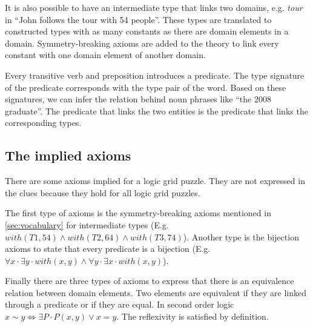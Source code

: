 
It is also possible to have an intermediate type that links two domains, e.g. \textit{tour} in ``John follows the tour with 54 people''. These types are translated to constructed types with as many constants as there are domain elements in a domain. Symmetry-breaking axioms are added to the theory to link every constant with one domain element of another domain.

Every transitive verb and preposition introduces a predicate. The type signature of the predicate corresponds with the type pair of the word. Based on these signatures, we can infer the relation behind noun phrases like ``the 2008 graduate''. The predicate that links the two entities is the predicate that links the corresponding types. %

\subsection{The implied axioms}
There are some axioms implied for a logic grid puzzle. They are not expressed in the clues because they hold for all logic grid puzzles.

The first type of axioms is the symmetry-breaking axioms mentioned in \ref{sec:vocabulary} for intermediate types (E.g. $with(T1, 54) \land with(T2, 64) \land with(T3, 74)$). Another type is the bijection axioms to state that every predicate is a bijection (E.g. $\forall x \cdot \exists y \cdot with(x, y) \land \forall y \cdot \exists x \cdot with(x, y)$).

Finally there are three types of axioms to express that there is an equivalence relation between domain elements. Two elements are equivalent if they are linked through a predicate or if they are equal. In second order logic $x \sim y \Leftrightarrow \exists P \cdot P(x, y) \lor x = y$. The reflexivity is satisfied by definition.

